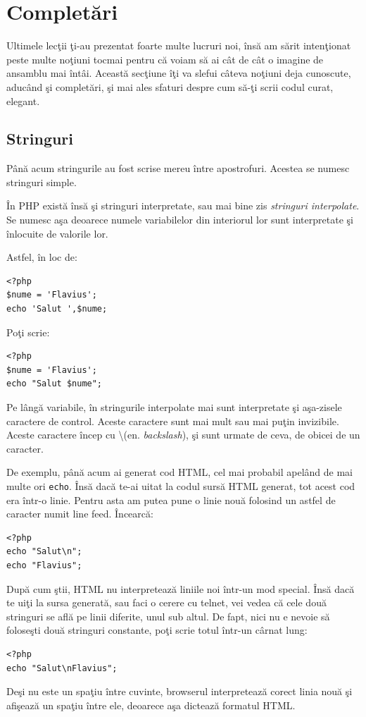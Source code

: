 \section{Completări}
Ultimele lecţii ţi-au prezentat foarte multe
lucruri noi, însă am sărit intenţionat peste multe
noţiuni tocmai pentru că voiam să ai cât de cât
o imagine de ansamblu mai întâi. Această secţiune îţi
va slefui câteva noţiuni deja cunoscute, aducând
şi completări, şi mai ales sfaturi despre
cum să-ţi scrii codul curat, elegant.


\subsection{Stringuri}
Până acum stringurile au fost scrise mereu
între apostrofuri. Acestea se numesc stringuri simple.

În PHP există însă şi stringuri interpretate,
sau mai bine zis \textsl{stringuri interpolate}. Se numesc
aşa deoarece numele variabilelor din interiorul lor
sunt interpretate şi înlocuite de valorile lor.

Astfel, în loc de:
\begin{lstlisting}
<?php
$nume = 'Flavius';
echo 'Salut ',$nume;
\end{lstlisting}
Poţi scrie:
\begin{lstlisting}
<?php
$nume = 'Flavius';
echo "Salut $nume";
\end{lstlisting}

Pe lângă variabile, în stringurile interpolate
mai sunt interpretate şi
aşa-zisele caractere de control. Aceste caractere
sunt mai mult sau mai puţin {\glqq}invizibile{\grqq}. Aceste
caractere încep cu \textbackslash (en. \textsl{backslash}),
şi sunt urmate de ceva, de obicei de un caracter.

De exemplu, până acum ai generat cod HTML,
cel mai probabil apelând de mai multe ori
\texttt{echo}. Însă dacă te-ai uitat la codul
sursă HTML generat, tot acest cod era într-o linie.
Pentru asta am putea pune o linie nouă folosind un astfel
de caracter numit line feed. Încearcă:
\begin{lstlisting}
<?php
echo "Salut\n";
echo "Flavius";
\end{lstlisting}
După cum ştii, HTML nu interpretează liniile noi într-un mod
special.  Însă dacă te uiţi la sursa generată, sau faci
o cerere cu telnet, vei vedea că cele două stringuri 
se află pe linii diferite, unul sub altul. De fapt, nici
nu e nevoie să foloseşti două stringuri constante, poţi
scrie totul într-un cârnat lung:
\begin{lstlisting}
<?php
echo "Salut\nFlavius";
\end{lstlisting}
Deşi nu este un spaţiu între cuvinte, browserul interpretează
corect linia nouă şi afişează un spaţiu între ele, deoarece
aşa dictează formatul HTML.

